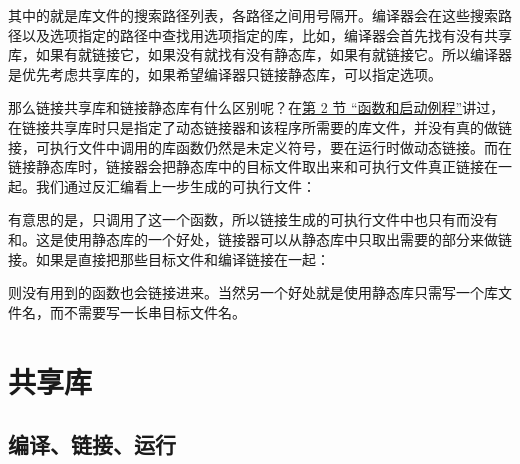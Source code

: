 

其中的就是库文件的搜索路径列表，各路径之间用\BookCode{:\BookSplit{}}号隔开。编译器会在这些搜索路径以及选项指定的路径中查找用选项指定的库，比如，编译器会首先找有没有共享库，如果有就链接它，如果没有就找有没有静态库，如果有就链接它。所以编译器是优先考虑共享库的，如果希望编译器只链接静态库，可以指定选项。



那么链接共享库和链接静态库有什么区别呢？在\hyperlink{db.ch19s02.id2776173}{第 2 节 “函数和启动例程”}讲过，在链接共享库时只是指定了动态链接器和该程序所需要的库文件，并没有真的做链接，可执行文件中调用的库函数仍然是未定义符号，要在运行时做动态链接。而在链接静态库时，链接器会把静态库中的目标文件取出来和可执行文件真正链接在一起。我们通过反汇编看上一步生成的可执行文件：




有意思的是，只调用了这一个函数，所以链接生成的可执行文件中也只有而没有和。这是使用静态库的一个好处，链接器可以从静态库中只取出需要的部分来做链接。如果是直接把那些目标文件和编译链接在一起：




则没有用到的函数也会链接进来。当然另一个好处就是使用静态库只需写一个库文件名，而不需要写一长串目标文件名。




\section{共享库}
%
\subsection{编译、链接、运行}
%


